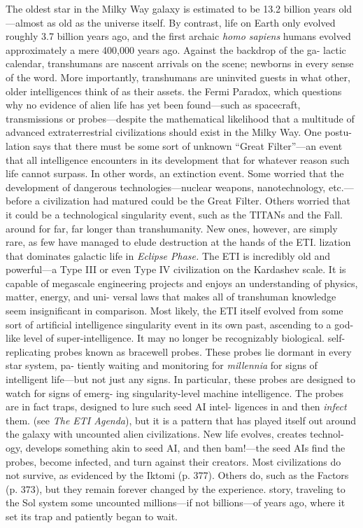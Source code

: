 The oldest star in the Milky Way galaxy is estimated 
to be 13.2 billion years old—almost as old as the 
universe itself. By contrast, life on Earth only evolved 
roughly 3.7 billion years ago, and the first  archaic 
\textit{homo sapiens} humans evolved approximately a mere 
400,000 years ago. Against the backdrop of the ga-
lactic calendar, transhumans are nascent arrivals on 
the scene; newborns in every sense of the word. More 
importantly, transhumans are uninvited guests in what 
other, older intelligences think of as their assets.
the Fermi Paradox, which questions why no evidence 
of alien life has yet been found—such as spacecraft, 
transmissions or probes—despite the mathematical 
likelihood that a multitude of advanced extraterrestrial 
civilizations should exist in the Milky Way. One postu-
lation says that there must be some sort of unknown 
``Great Filter''—an event that all intelligence encounters 
in its development that for whatever reason such life 
cannot surpass. In other words, an extinction event. 
Some worried that the development of dangerous 
technologies—nuclear weapons, nanotechnology, etc.—
before a civilization had matured could be the Great 
Filter. Others worried that it could be a technological 
singularity event, such as the TITANs and the Fall.
around for far, far longer than transhumanity. New 
ones, however, are simply rare, as few have managed 
to elude destruction at the hands of the ETI.
lization that dominates galactic life in \textit{Eclipse Phase.} 
The ETI is incredibly old and powerful—a Type III or 
even Type IV civilization on the Kardashev scale. It is 
capable of megascale engineering projects and enjoys 
an understanding of physics, matter, energy, and uni-
versal laws that makes all of transhuman knowledge 
seem insignificant in comparison. Most likely, the ETI 
itself evolved from some sort of artificial intelligence 
singularity event in its own past, ascending to a god-
like level of super-intelligence. It may no longer be 
recognizably biological.
self-replicating probes known as bracewell probes. 
These probes lie dormant in every star system, pa-
tiently waiting and monitoring for \textit{millennia} for signs 
of intelligent life—but not just any signs. In particular, 
these probes are designed to watch for signs of emerg-
ing singularity-level machine intelligence. The probes 
are in fact traps, designed to lure such seed AI intel-
ligences in and then \textit{infect} them. 
(see  \textit{The ETI Agenda}), but it is a pattern that has 
played itself out around the galaxy with uncounted 
alien civilizations. New life evolves, creates technol-
ogy, develops something akin to seed AI, and then 
bam!—the seed AIs find the probes, become infected, 
and turn against their creators. Most civilizations 
do not survive, as evidenced by the Iktomi (p. 377). 
Others do, such as the Factors (p. 373), but they 
remain forever changed by the experience. 
story, traveling to the Sol system some uncounted 
millions—if not billions—of years ago, where it set its 
trap and patiently began to wait.

